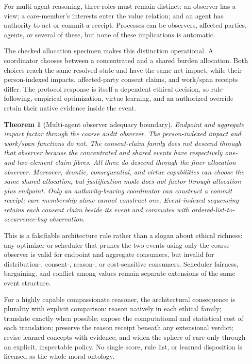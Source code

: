 \documentclass[11pt]{article}
\newtheorem{theorem}{Theorem}
\theoremstyle{definition}
\theoremstyle{remark}
\begin{document}
For multi-agent reasoning, three roles must remain distinct: an observer has a
view; a care-member's interests enter the value relation; and an agent has
authority to act or commit a receipt.  Processes can be observers, affected
parties, agents, or several of these, but none of these implications is automatic.

The checked allocation specimen makes this distinction operational.  A
coordinator chooses between a concentrated and a shared burden allocation.
Both choices reach the same resolved state and have the same net impact, while
their person-indexed impacts, affected-party consent claims, and work/span
receipts differ.  The protocol response is itself a dependent ethical decision,
so rule-following, empirical optimization, virtue learning, and an authorized
override retain their native evidence inside the event.

\begin{theorem}[Multi-agent observer adequacy boundary]
Endpoint and aggregate impact factor through the coarse audit observer.  The
person-indexed impact and work/span functions do not.  The consent-claim family
does not descend through that observer because the concentrated and shared
events have respectively one- and two-element claim fibres.  All three do
descend through the finer allocation observer.  Moreover, deontic,
consequential, and virtue capabilities can choose the same shared allocation,
but justification mode does not factor through allocation plus endpoint.
Only an authority-bearing coordinator can construct a commit receipt; care
membership alone cannot construct one.  Event-indexed sequencing retains each
consent claim beside its event and commutes with ordered-list-to-occurrence-bag
observation.
\end{theorem}

This is a falsifiable architecture rule rather than a slogan about ethical
richness: any optimizer or scheduler that prunes the two events using only the
coarse observer is valid for endpoint and aggregate consumers, but invalid for
distribution-, consent-, reason-, or cost-sensitive consumers.  Scheduler
fairness, bargaining, and conflict among values remain separate extensions of
the same event structure.

For a highly capable compassionate reasoner, the architectural consequence is
plurality with explicit comparison: reason natively in each ethical family;
translate exactly when possible; expose the computational and statistical cost
of each translation; preserve the reason receipt beneath any extensional
verdict; revise learned concepts with evidence; and widen the sphere of care only
through an explicit, inspectable policy.  No single score, rule list, or learned
disposition is licensed as the whole moral ontology.
\end{document}
